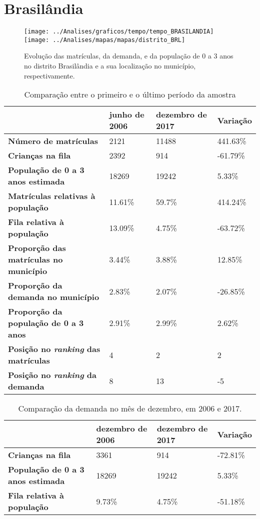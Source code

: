 \section{Brasilândia}
\begin{figure}[H]
\centering
\texttt{[image: ../Analises/graficos/tempo/tempo\_BRASILANDIA]}
\texttt{[image: ../Analises/mapas/mapas/distrito\_BRL]}
\caption{Evolução das matrículas, da demanda, e da população de 0 a 3 anos no distrito Brasilândia e a sua localização no município, respectivamente.}
\end{figure}
\begin{table}[H]
\begin{tabular}{l|l|l|l}
\textbf{}                                      & \textbf{junho de 2006}       & \textbf{dezembro de 2017}    & \textbf{Variação} \\ \hline
\textbf{Número de matrículas}                  & 2121 & 11488 & 441.63\% \\ \hline
\textbf{Crianças na fila}                      & 2392 & 914 & -61.79\% \\ \hline
\textbf{População de 0 a 3 anos estimada}      & 18269 & 19242 & 5.33\% \\ \hline
\textbf{Matrículas relativas à população}      & 11.61\% & 59.7\% & 414.24\% \\ \hline
\textbf{Fila relativa à população}             & 13.09\% & 4.75\% & -63.72\% \\ \hline
\textbf{Proporção das matrículas no município} & 3.44\% & 3.88\% & 12.85\% \\ \hline
\textbf{Proporção da demanda no município}     & 2.83\% & 2.07\% & -26.85\% \\ \hline
\textbf{Proporção da população de 0 a 3 anos}  & 2.91\% & 2.99\% & 2.62\% \\ \hline
\textbf{Posição no \textit{ranking} das matrículas}     & 4 & 2 & 2 \\ \hline
\textbf{Posição no \textit{ranking} da demanda}         & 8 & 13 & -5 \\ 
\end{tabular}
\caption{Comparação entre o primeiro e o último período da amostra}
\end{table}
\begin{table}[H]
\begin{tabular}{l|l|l|l}
\textbf{}                                 & \textbf{dezembro de 2006} & \textbf{dezembro de 2017} & \textbf{Variação} \\ \hline
\textbf{Crianças na fila}                      & 3361 & 914 & -72.81\% \\ \hline
\textbf{População de 0 a 3 anos estimada}      & 18269 & 19242 & 5.33\% \\ \hline
\textbf{Fila relativa à população}             & 9.73\% & 4.75\% & -51.18\% \\
\end{tabular}
\caption{Comparação da demanda no mês de dezembro, em 2006 e 2017.}
\end{table}
